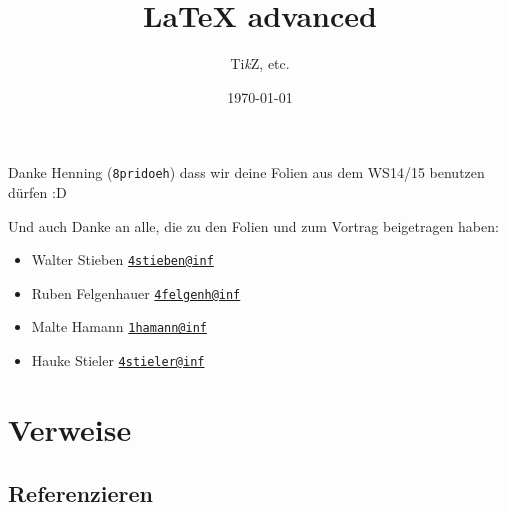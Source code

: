 \documentclass{beamer}
\title{\LaTeX{} advanced}
\subtitle{\small Ti\textit{k}Z, etc.}
\date{\footnotesize \today}
\begin{document}
	\maketitle


	\begin{frame}
		\begin{center}
			Danke Henning (\texttt{8pridoeh}) dass wir deine Folien aus dem WS14/15 benutzen dürfen :D
		\end{center}
		Und auch Danke an alle, die zu den Folien und zum Vortrag beigetragen haben:
		\begin{itemize}
			\item Walter Stieben \texttt{\href{mailto:4stieben@informatik.uni-hamburg.de}{4stieben@inf}}\\
			\item Ruben Felgenhauer \texttt{\href{mailto:4felgenh@informatik.uni-hamburg.de}{4felgenh@inf}}\\
			\item Malte Hamann \texttt{\href{mailto:1hamann@informatik.uni-hamburg.de}{1hamann@inf}}\\
			\item Hauke Stieler \texttt{\href{mailto:4stieler@informatik.uni-hamburg.de}{4stieler@inf}}
		\end{itemize}
	\end{frame}
	
	
	\begin{frame}
		\tableofcontents[hideallsubsections]
	\end{frame}



	\section{Verweise}
		\sectionTitleFrame
	
		\subsection{Referenzieren}

\end{document}
